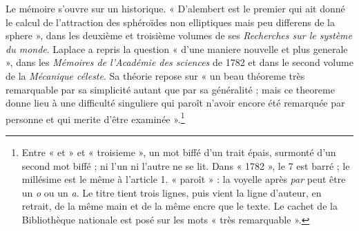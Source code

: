 \documentclass[11pt,a4paper]{article}
\begin{document}
Le mémoire s'ouvre sur un historique. « D'alembert est le premier qui ait donné
le calcul de l'attraction des sphéroïdes non elliptiques mais peu differens de
la sphere », dans les deuxième et troisième volumes de ses \emph{Recherches sur
le système du monde}. Laplace a repris la question « d'une maniere nouvelle et
plus generale », dans les \emph{Mémoires de l'Académie des sciences} de 1782 et
dans le second volume de la \emph{Mécanique céleste}. Sa théorie repose sur
« un beau théoreme très remarquable par sa simplicité autant que par sa
généralité ; mais ce theoreme donne lieu à une difficulté singuliere qui paroît
n'avoir encore été remarquée par personne et qui merite d'être
examinée ».\footnote{Entre « et » et « troisieme », un mot biffé d'un trait
épais, surmonté d'un second mot biffé ; ni l'un ni l'autre ne se lit. Dans
« 1782 », le 7 est barré ; le millésime est le même à l'article 1. « paroît » :
la voyelle après \emph{par} peut être un \emph{o} ou un \emph{a}. Le titre
tient trois lignes, puis vient la ligne d'auteur, en retrait, de la même main
et de la même encre que le texte. Le cachet de la Bibliothèque nationale est
posé sur les mots « très remarquable ».}
\end{document}
